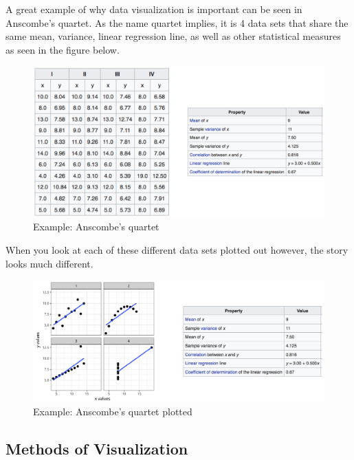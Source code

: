 \begin{flushleft}
A great example of why data visualization is important can be seen in Anscombe’s quartet. As the name quartet implies, it is 4 data sets that share the same mean, variance, linear regression line, as well as other statistical measures as seen in the figure below.
\end{flushleft}

\begin{figure}[h]
    \centering
    \includegraphics[width=.75\textwidth]{figures/Anscombes_quartet.png}
    \caption{Example: Anscombe's quartet}
    \label{fig:Anscombes}
\end{figure}

\begin{flushleft}
When you look at each of these different data sets plotted out however, the story looks much different.
\end{flushleft}

\begin{figure}[h]
    \centering
    \includegraphics[width=.75\textwidth]{figures/Anscombes_quartet_plotted.png}
    \caption{Example: Anscombe's quartet plotted}
    \label{fig:Anscombes_plotted}
\end{figure}

\subsection{Methods of Visualization}

